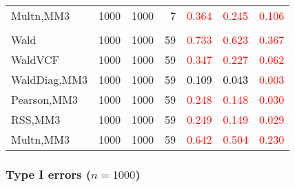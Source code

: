 \documentclass[
]{article}
\begin{document}
\begin{table}[H]
{\begin{tabular}[t]{lrrrrrr}
\hspace{1em}Multn,MM3 & 1000 & 1000 & 7 & \textcolor{red}{0.364} & \textcolor{red}{0.245} & \textcolor{red}{0.106}\\
\addlinespace[0.3em]
\multicolumn{7}{l}{\textbf{3F 15V}}\\
\hspace{1em}Wald & 1000 & 1000 & 59 & \textcolor{red}{0.733} & \textcolor{red}{0.623} & \textcolor{red}{0.367}\\
\hspace{1em}WaldVCF & 1000 & 1000 & 59 & \textcolor{red}{0.347} & \textcolor{red}{0.227} & \textcolor{red}{0.062}\\
\hspace{1em}WaldDiag,MM3 & 1000 & 1000 & 59 & \textcolor{black}{0.109} & \textcolor{black}{0.043} & \textcolor{red}{0.003}\\
\hspace{1em}Pearson,MM3 & 1000 & 1000 & 59 & \textcolor{red}{0.248} & \textcolor{red}{0.148} & \textcolor{red}{0.030}\\
\hspace{1em}RSS,MM3 & 1000 & 1000 & 59 & \textcolor{red}{0.249} & \textcolor{red}{0.149} & \textcolor{red}{0.029}\\
\hspace{1em}Multn,MM3 & 1000 & 1000 & 59 & \textcolor{red}{0.642} & \textcolor{red}{0.504} & \textcolor{red}{0.230}\\
\bottomrule
\end{tabular}}
\endgroup{}
\end{table}

\hypertarget{type-i-errors-n1000-1}{%
\subsubsection{\texorpdfstring{Type I errors
(\(n=1000\))}{Type I errors (n=1000)}}\label{type-i-errors-n1000-1}}
\end{document}
